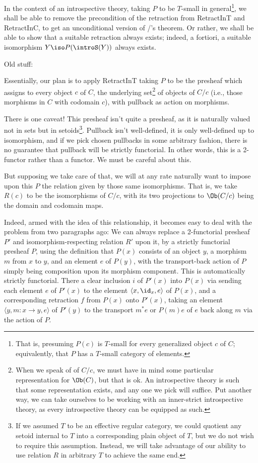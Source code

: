 In the context of an introspective theory, taking $P$ to be $T$-small in general\footnote{That is, presuming $P(c)$ is $T$-small for every generalized object $c$ of $C$; equivalently, that $P$ has a $T$-small category of elements.}, we shall be able to remove the precondition of the retraction from RetractInT and RetractInC, to get an unconditional version of \Loeb/'s theorem. Or rather, we shall be able to show that a suitable retraction always exists; indeed, a fortiori, a suitable isomorphism $Y \iso P(\introS(Y))$ always exists.

Old stuff:


Essentially, our plan is to apply RetractInT \TODO taking $P$ to be the presheaf which assigns to every object $c$ of $C$, the underlying set\footnote{When we speak of  of $C/c$, we must have in mind some particular representation for $\Ob(C)$, but that is ok. An introspective theory is such that some representation exists, and any one we pick will suffice. Put another way, we can take ourselves to be working with an inner-strict introspective theory, as every introspective theory can be equipped as such.} of objects of $C/c$ (i.e., those morphisms in $C$ with codomain $c$), with pullback as action on morphisms.

There is one caveat! This presheaf isn't quite a presheaf, as it is naturally valued not in sets but in setoids\footnote{If we assumed $T$ to be an effective regular category, we could quotient any setoid internal to $T$ into a corresponding plain object of $T$, but we do not wish to require this assumption. Instead, we will take advantage of our ability to use relation $R$ in arbitrary $T$ to achieve the same end.}. Pullback isn't well-defined, it is only well-defined up to isomorphism, and if we pick chosen pullbacks in some arbitrary fashion, there is no guarantee that pullback will be strictly functorial. In other words, this is a 2-functor rather than a functor. We must be careful about this.

But supposing we take care of that, we will at any rate naturally want to impose upon this $P$ the relation given by those same isomorphisms. That is, we take $R(c)$ to be the isomorphisms of $C/c$, with its two projections to $\Ob(C/c)$ being the domain and codomain maps.

Indeed, armed with the idea of this relationship, it becomes easy to deal with the problem from two paragraphs ago: We can always replace a 2-functorial presheaf $P'$ and isomorphism-respecting relation $R'$ upon it, by a strictly functorial presheaf $P$, using the definition that $P(x)$ consists of an object $y$, a morphism $m$ from $x$ to $y$, and an element $e$ of $P(y)$, with the transport-back action of $P$ simply being composition upon its morphism component. This is automatically strictly functorial. There a clear inclusion $i$ of $P'(x)$ into $P(x)$ via sending each element $e$ of $P'(x)$ to the element $\langle x, \id_x, e \rangle$ of $P(x)$, and a corresponding retraction $f$ from $P(x)$ onto $P'(x)$, taking an element $\langle y, m : x \to y, e \rangle$ of $P'(y)$ to the transport $m^* e$ or $P(m) e$ of $e$ back along $m$ via the action of $P$.

